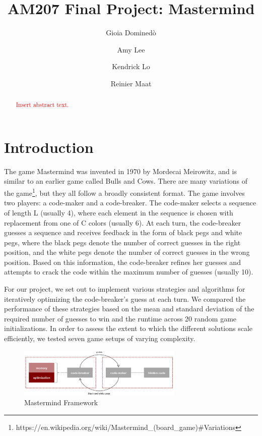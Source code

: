 \documentclass[11pt]{article}
\title{AM207 Final Project: Mastermind}
\author{Gioia Domined\`o \and Amy Lee \and Kendrick Lo \and Reinier Maat}
\begin{document}
\maketitle{}

\begin{abstract}
\textcolor{red}{Insert abstract text.}
\end{abstract}

\pagestyle{plain}

\section{Introduction}

The game Mastermind was invented in 1970 by Mordecai Meirowitz, and is similar to an earlier game called Bulls and Cows. There are many variations of the game\footnote{https://en.wikipedia.org/wiki/Mastermind\_(board\_game)\#Variations}, but they all follow a broadly consistent format. The game involves two players: a code-maker and a code-breaker. The code-maker selects a sequence of length L (usually 4), where each element in the sequence is chosen with replacement from one of C colors (usually 6). At each turn, the code-breaker guesses a sequence and receives feedback in the form of black pegs and white pegs, where the black pegs denote the number of correct guesses in the right position, and the white pegs denote the number of correct guesses in the wrong position. Based on this information, the code-breaker refines her guesses and attempts to crack the code within the maximum number of guesses (usually 10).

For our project, we set out to implement various strategies and algorithms for iteratively optimizing the code-breaker's guess at each turn. We compared the performance of these strategies based on the mean and standard deviation of the required number of guesses to win and the runtime across 20 random game initializations. In order to assess the extent to which the different solutions scale efficiently, we tested seven game setups of varying complexity.

\begin{figure}[!htbp]
\centering
\includegraphics[width=0.7\textwidth]{img/game_setup}
\caption{Mastermind Framework}
\label{fig:game_setup}
\end{figure}
\end{document}
